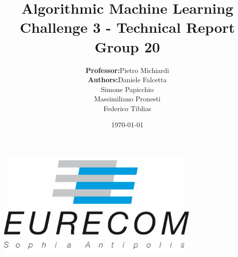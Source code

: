 \title{\Large Algorithmic Machine Learning  \\[0.5cm]
	\bf\Large Challenge 3 - Technical Report \\[0.5cm]
	
	\bf\Large Group 20}

\author{\large 
	\begin{tabular}{rl}
		\textbf{Professor:} & Pietro Michiardi \\
		\textbf{Authors:} & Daniele Falcetta \\ & Simone Papicchio \\ & Massimiliano Pronesti \\ & Federico Tiblias
	\end{tabular}
	}
\date{\large \today}

\makeatletter
\begin{titlepage}
	\begin{center}
		{ \includegraphics[width=10cm]{assets/eurecom.png}}
		{\ \\ \ \\}
		\vbox{}\vspace{5cm}
		{\@title }\\[3cm]
		{\@author}\\[3cm]
		{\@date\\}
		
	\end{center}
\end{titlepage}
\makeatother